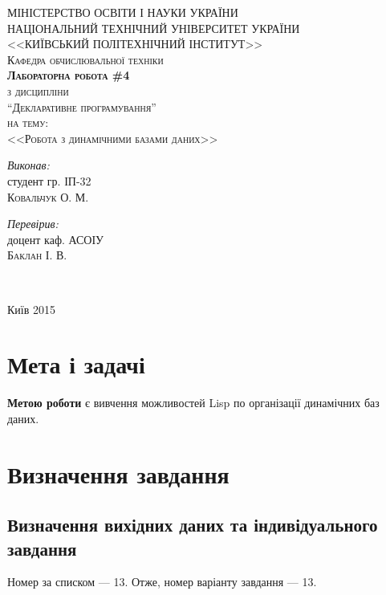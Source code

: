 \documentclass[a4paper, 12pt]{extarticle}
\begin{document}
\begin{titlepage}
  \thispagestyle{empty}\center
  \textsc{\uppercase{Міністерство освіти і науки України\\Національний технічний університет України\\<<Київський політехнічний інститут>>}}\\[1cm]
  \textsc{Кафедра обчислювальної техніки}\\[0.5cm]
  \vfill
  \textsc{\Large \textbf{Лабораторна робота \#4}}\\
  \textsc{з дисципліни}\\
  \textsc{\large ``Декларативне програмування''}\\
  \textsc{на тему:}\\
  \textsc{\Large <<Робота з динамічними базами даних>>}\\
  \vspace{3cm}
  \begin{minipage}{0.4\textwidth}
    \begin{flushleft} \large
      \emph{Виконав:}\\
      студент гр. ІП-32 \\
      \textsc{Ковальчук О. М.} %
    \end{flushleft}
  \end{minipage}
  \begin{minipage}{0.4\textwidth}
    \begin{flushright} \large
      \emph{Перевірив:} \\
      доцент каф. АСОІУ \\
      \textsc{Баклан І. В.} %
    \end{flushright}
  \end{minipage}\\[4cm]
  \vfill

  Київ 2015
\end{titlepage}
\setcounter{page}{2}
\section{Мета і задачі}
\textbf{Метою роботи} є вивчення можливостей Lisp по організації динамічних баз даних.
\section{Визначення завдання}
\subsection{Визначення вихідних даних та індивідуального завдання}
Номер за списком --- 13. Отже, номер варіанту завдання --- 13.
\end{document}
